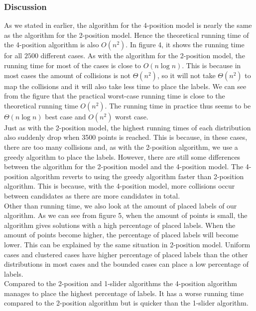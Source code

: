 \documentclass[crop=false,a4paper,oneside,11pt]{standalone}
\begin{document}
\subsubsection{Discussion}
As we stated in earlier, the algorithm for the 4-position model is nearly the same as the algorithm for the 2-position model. Hence the theoretical running time of the 4-position algorithm is also $O(n^2)$. In figure 4, it shows the running time for all $2500$ different cases. As with the algorithm for the 2-position model, the running time for most of the cases is close to $O(n\log n)$. This is because in most cases the amount of collisions is not $\Theta(n^2)$, so it will not take $\Theta(n^2)$ to map the collisions and it will also take less time to place the labels. We can see from the figure that the practical worst-case running time is close to the theoretical running time $O(n^2)$. The running time in practice thus seems to be $\Theta(n \log n)$ best case and $O(n^2)$ worst case.\\
Just as with the 2-position model, the highest running times of each distribution also suddenly drop when 3500 points is reached. This is because, in these cases, there are too many collisions and, as with the 2-position algorithm, we use a greedy algorithm to place the labels. However, there are still some differences between the algorithm for the 2-position model and the 4-position model. The 4-position algorithm reverts to using the greedy algorithm faster than 2-position algorithm. This is because, with the 4-position model, more collisions occur between candidates as there are more candidates in total.\\
Other than running time, we also look at the amount of placed labels of our algorithm. As we can see from figure 5, when the amount of points is small, the algorithm gives solutions with a high percentage of placed labels. When the amount of points become higher, the percentage of placed labels will become lower. This can be explained by the same situation in 2-position model. Uniform cases and clustered cases have higher percentage of placed labels than the other distributions in most cases and the bounded cases can place a low percentage of labels.\\
Compared to the 2-position and 1-slider algorithms the 4-position algorithm manages to place the highest percentage of labels. It has a worse running time compared to the 2-position algorithm but is quicker than the 1-slider algorithm.\\
\end{document}
